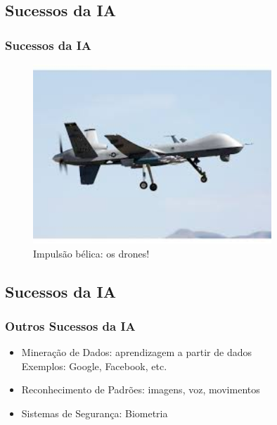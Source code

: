 \documentclass{beamer}
\begin{document}
\subsection{Sucessos da IA}
\begin{frame}
\frametitle{Sucessos da IA}

\begin{figure}[ht!]
 \centering
 \includegraphics[width=0.8\textwidth , height=0.6\textheight]{figures/drones.jpeg}
\caption{Impulsão bélica: os drones!}

\end{figure}

\end{frame}



\subsection{Sucessos da IA}
\begin{frame}
\frametitle{Outros Sucessos da IA}
\begin{block}{}
  \begin{itemize}
   \item Mineração de Dados: aprendizagem a partir de dados\\
   Exemplos: Google, Facebook, etc.

    \item Reconhecimento de Padrões: imagens, voz, movimentos

    \item Sistemas de Segurança: Biometria 


    
    \end{itemize}
  
\end{block}

\end{frame}
\end{document}
